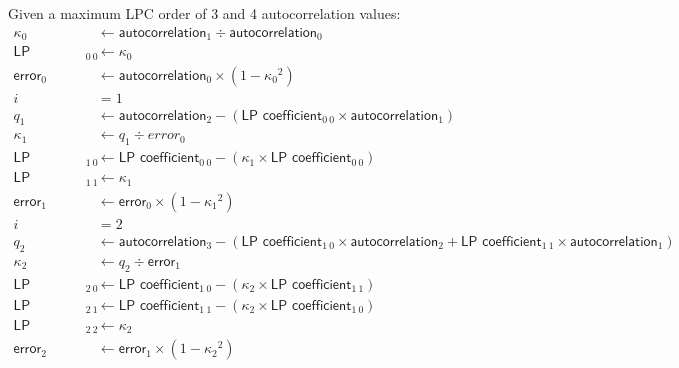 {
Given a maximum LPC order of 3 and 4 autocorrelation values:
\begin{align*}
\kappa_0 &\leftarrow \textsf{autocorrelation}_1 \div \textsf{autocorrelation}_0 \\
\textsf{LP coefficient}_{0~0} &\leftarrow \kappa_0 \\
\textsf{error}_0 &\leftarrow \textsf{autocorrelation}_0 \times (1 - {\kappa_0} ^ 2) \\
i &= 1 \\
q_1 &\leftarrow \textsf{autocorrelation}_2 - (\textsf{LP coefficient}_{0~0} \times \textsf{autocorrelation}_{1}) \\
\kappa_1 &\leftarrow q_1 \div error_0 \\
\textsf{LP coefficient}_{1~0} &\leftarrow \textsf{LP coefficient}_{0~0} - (\kappa_1 \times \textsf{LP coefficient}_{0~0}) \\
\textsf{LP coefficient}_{1~1} &\leftarrow \kappa_1 \\
\textsf{error}_1 &\leftarrow \textsf{error}_0 \times (1 - {\kappa_1} ^ 2) \\
i &= 2 \\
q_2 &\leftarrow \textsf{autocorrelation}_3 - (\textsf{LP coefficient}_{1~0} \times \textsf{autocorrelation}_{2} + \textsf{LP coefficient}_{1~1} \times \textsf{autocorrelation}_{1}) \\
\kappa_2 &\leftarrow q_2 \div \textsf{error}_1 \\
\textsf{LP coefficient}_{2~0} &\leftarrow \textsf{LP coefficient}_{1~0} - (\kappa_2 \times \textsf{LP coefficient}_{1~1}) \\
\textsf{LP coefficient}_{2~1} &\leftarrow \textsf{LP coefficient}_{1~1} - (\kappa_2 \times \textsf{LP coefficient}_{1~0}) \\
\textsf{LP coefficient}_{2~2} &\leftarrow \kappa_2 \\
\textsf{error}_2 &\leftarrow \textsf{error}_1 \times (1 - {\kappa_2} ^ 2) \\
\end{align*}
}

\clearpage

